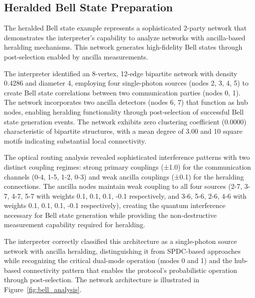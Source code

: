 \documentclass[11pt,a4paper]{article}
\begin{document}
\subsection{Heralded Bell State Preparation}

The heralded Bell state example represents a sophisticated 2-party network that demonstrates the interpreter's capability to analyze networks with ancilla-based heralding mechanisms. This network generates high-fidelity Bell states through post-selection enabled by ancilla measurements.

The interpreter identified an 8-vertex, 12-edge bipartite network with density 0.4286 and diameter 4, employing four single-photon sources (nodes 2, 3, 4, 5) to create Bell state correlations between two communication parties (nodes 0, 1). The network incorporates two ancilla detectors (nodes 6, 7) that function as hub nodes, enabling heralding functionality through post-selection of successful Bell state generation events. The network exhibits zero clustering coefficient (0.0000) characteristic of bipartite structures, with a mean degree of 3.00 and 10 square motifs indicating substantial local connectivity.

The optical routing analysis revealed sophisticated interference patterns with two distinct coupling regimes: strong primary couplings (±1.0) for the communication channels (0-4, 1-5, 1-2, 0-3) and weak ancilla couplings (±0.1) for the heralding connections. The ancilla nodes maintain weak coupling to all four sources (2-7, 3-7, 4-7, 5-7 with weights 0.1, 0.1, 0.1, -0.1 respectively, and 3-6, 5-6, 2-6, 4-6 with weights 0.1, 0.1, 0.1, -0.1 respectively), creating the quantum interference necessary for Bell state generation while providing the non-destructive measurement capability required for heralding.

The interpreter correctly classified this architecture as a single-photon source network with ancilla heralding, distinguishing it from SPDC-based approaches while recognizing the critical dual-mode operation (modes 0 and 1) and the hub-based connectivity pattern that enables the protocol's probabilistic operation through post-selection. The network architecture is illustrated in Figure~\ref{fig:bell_analysis}.
\end{document}
